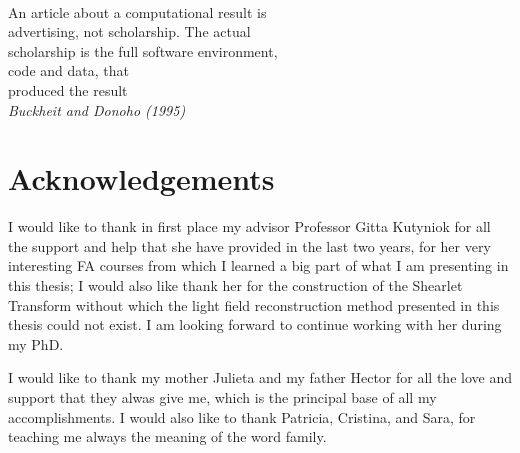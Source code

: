 \documentclass[11pt, english, singlespacing, headsepline, ]{MastersDoctoralThesis}
\theoremstyle{definition}
\begin{document}
\cleardoublepage
 $\mbox{}$\\
An article about a computational result is \\
advertising, not scholarship. The actual \\
scholarship is the full software environment,\\
code and data, that \\
produced the result
\\

\textit{Buckheit and Donoho (1995)}






\chapter*{Acknowledgements}\pagestyle{empty}
I would like to thank in first place my advisor Professor Gitta Kutyniok for all the support and help that she have provided in the last two years, for her very interesting FA courses from which I learned a big part of what I am presenting in this thesis; I would also like thank her for the construction of the Shearlet Transform without which the light field reconstruction method presented in this thesis could not exist. I am looking forward to continue working with her during my PhD.

\bigskip

I would like to thank my mother Julieta and my father Hector for all the love and support that they alwas give me, which is the principal base of all my accomplishments. I would also like to thank Patricia, Cristina, and Sara, for teaching me always the meaning of the word family. 
\end{document}
